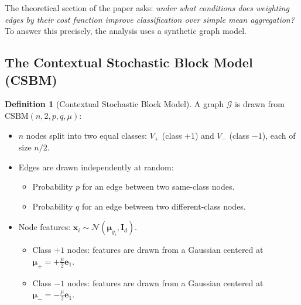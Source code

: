 \documentclass[11pt,a4paper]{article}
\newcommand{\G}{\mathcal{G}}
\newcommand{\bx}{\mathbf{x}}
\theoremstyle{definition}
\newtheorem{definition}{Definition}[section]
\theoremstyle{plain}
\begin{document}
The theoretical section of the paper asks: \emph{under what conditions does
weighting edges by their cost function improve classification over simple
mean aggregation?}
To answer this precisely, the analysis uses a synthetic graph model.


\subsection{The Contextual Stochastic Block Model (CSBM)}
\label{sec:csbm}

\begin{definition}[Contextual Stochastic Block Model]
A graph $\G$ is drawn from $\mathrm{CSBM}(n, 2, p, q, \mu)$:
\begin{itemize}[nosep]
  \item $n$ nodes split into two equal classes: $V_+$ (class +1) and $V_-$ (class $-1$),
    each of size $n/2$.
  \item Edges are drawn independently at random:
    \begin{itemize}[nosep]
      \item Probability $p$ for an edge between two same-class nodes.
      \item Probability $q$ for an edge between two different-class nodes.
    \end{itemize}
  \item Node features: $\bx_i \sim \mathcal{N}(\boldsymbol{\mu}_{y_i}, \mathbf{I}_d)$.
    \begin{itemize}[nosep]
      \item Class $+1$ nodes: features are drawn from a Gaussian centered at
        $\boldsymbol{\mu}_+ = +\frac{\mu}{2}\mathbf{e}_1$.
      \item Class $-1$ nodes: features are drawn from a Gaussian centered at
        $\boldsymbol{\mu}_- = -\frac{\mu}{2}\mathbf{e}_1$.
    \end{itemize}
\end{itemize}
\end{definition}
\end{document}
